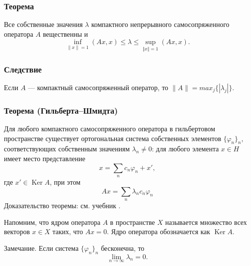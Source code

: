 \subsubsection*{Теорема}
Все собственные значения $\lambda$ компактного непрерывного самосопряженного оператора $A$ вещественны и
$$\inf_{\| x \| = 1}(Ax, x) \leqslant \lambda \leqslant \sup_{\Vert x \Vert = 1}(Ax, x).$$

\subsubsection*{Следствие}
Если $A$ --- компактный самосопряженный оператор, то $\|A\| = max_j\{|\lambda_j|\}$.

\subsubsection*{Теорема (Гильберта--Шмидта)}
Для любого компактного самосопряженного оператора в гильбертовом пространстве существует ортогональная система собственных элементов $\{\varphi_n\}_n$, соответствующих собственным значениям
$\lambda_n \neq 0$: для любого элемента $x \in H$ имеет место представление
$$x = \sum_{n}c_n\varphi_n + x',$$
где $x' \in \operatorname{Ker}A$, при этом
$$Ax = \sum_{n}\lambda_nc_n \varphi_n$$
Доказательство теоремы: см. учебник \cite[с.~246]{kolmogorov}.

Напомним, что ядром оператора $A$ в пространстве $X$ называется множество всех векторов $x \in X$ таких, что $Ax = 0$. Ядро оператора обозначается как $\operatorname{Ker}A$.

Замечание. Если система $\{\varphi_n\}_n$ бесконечна, то
$$\lim_{n \to \infty}\lambda_n = 0.$$